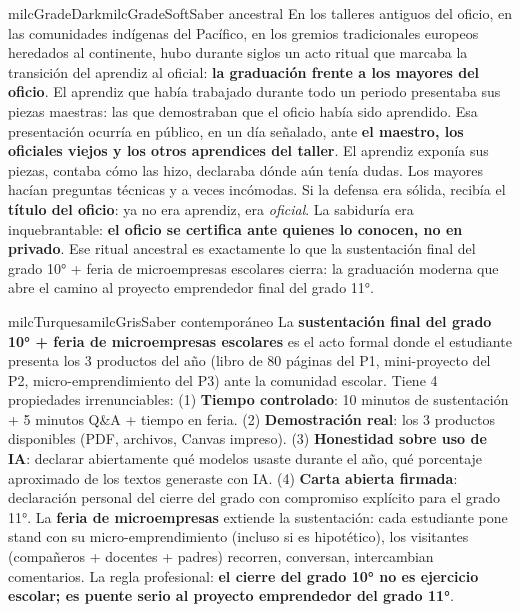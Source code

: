 \documentclass[11pt,letterpaper]{article}
\begin{document}
\begin{softbox}{milcGradeDark}{milcGradeSoft}{Saber ancestral}
En los talleres antiguos del oficio, en las comunidades indígenas del Pacífico, en los gremios tradicionales europeos heredados al continente, hubo durante siglos un acto ritual que marcaba la transición del aprendiz al oficial: \textbf{la graduación frente a los mayores del oficio}. El aprendiz que había trabajado durante todo un periodo presentaba sus piezas maestras: las que demostraban que el oficio había sido aprendido. Esa presentación ocurría en público, en un día señalado, ante \textbf{el maestro, los oficiales viejos y los otros aprendices del taller}. El aprendiz exponía sus piezas, contaba cómo las hizo, declaraba dónde aún tenía dudas. Los mayores hacían preguntas técnicas y a veces incómodas. Si la defensa era sólida, recibía el \textbf{título del oficio}: ya no era aprendiz, era \emph{oficial}. La sabiduría era inquebrantable: \textbf{el oficio se certifica ante quienes lo conocen, no en privado}. Ese ritual ancestral es exactamente lo que la sustentación final del grado 10° + feria de microempresas escolares cierra: la graduación moderna que abre el camino al proyecto emprendedor final del grado 11°.
\end{softbox}

\begin{softbox}{milcTurquesa}{milcGris}{Saber contemporáneo}
La \textbf{sustentación final del grado 10° + feria de microempresas escolares} es el acto formal donde el estudiante presenta los 3 productos del año (libro de 80 páginas del P1, mini-proyecto del P2, micro-emprendimiento del P3) ante la comunidad escolar. Tiene 4 propiedades irrenunciables: (1) \textbf{Tiempo controlado}: 10 minutos de sustentación + 5 minutos Q\&A + tiempo en feria. (2) \textbf{Demostración real}: los 3 productos disponibles (PDF, archivos, Canvas impreso). (3) \textbf{Honestidad sobre uso de IA}: declarar abiertamente qué modelos usaste durante el año, qué porcentaje aproximado de los textos generaste con IA. (4) \textbf{Carta abierta firmada}: declaración personal del cierre del grado con compromiso explícito para el grado 11°. La \textbf{feria de microempresas} extiende la sustentación: cada estudiante pone stand con su micro-emprendimiento (incluso si es hipotético), los visitantes (compañeros + docentes + padres) recorren, conversan, intercambian comentarios. La regla profesional: \textbf{el cierre del grado 10° no es ejercicio escolar; es puente serio al proyecto emprendedor del grado 11°}.
\end{softbox}
\end{document}
